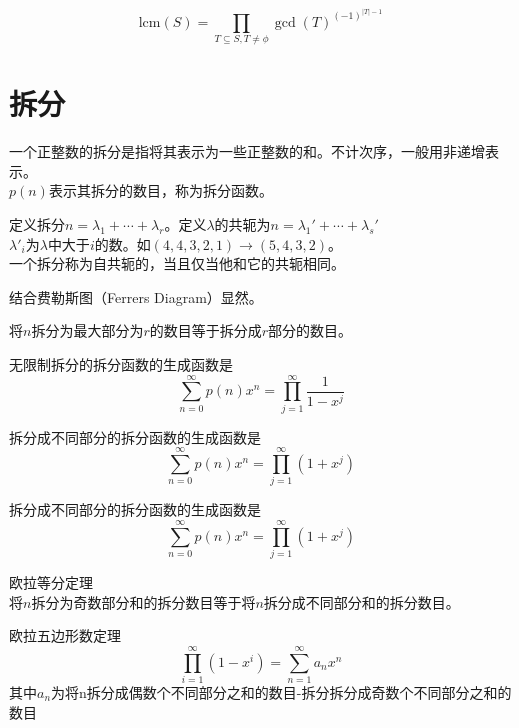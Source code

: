 \begin{proposition}
  $$
\text{lcm}(S)=\prod_{T\subseteq S ,T\neq \phi} \gcd(T)^{(-1)^{|T|-1}}
$$
\end{proposition}

\section{拆分}

\begin{definition}
  一个正整数的拆分是指将其表示为一些正整数的和。不计次序，一般用非递增表示。\\
  $p(n)$表示其拆分的数目，称为拆分函数。
\end{definition}

\begin{definition}
  定义拆分$n=\lambda_1 +\cdots + \lambda_r$。定义$\lambda$的共轭为$n=\lambda_1' +\cdots + \lambda_s'$\\
  $\lambda'_i$为$\lambda$中大于$i$的数。如$(4,4,3,2,1) \to (5,4,3,2)$。\\
  一个拆分称为自共轭的，当且仅当他和它的共轭相同。
\end{definition}
结合费勒斯图（Ferrers Diagram）显然。

\begin{theorem}
  将$n$拆分为最大部分为$r$的数目等于拆分成$r$部分的数目。
\end{theorem}

\begin{theorem}
  无限制拆分的拆分函数的生成函数是
  $$
  \sum_{n=0}^{\infty} p(n) x^n =\prod_{j=1} ^{\infty} \frac{1}{1-x^j}
  $$
\end{theorem}

\begin{theorem}
  拆分成不同部分的拆分函数的生成函数是
  $$
  \sum_{n=0}^{\infty} p(n) x^n =\prod_{j=1} ^{\infty} (1+x^j)
  $$
\end{theorem}

\begin{theorem}
  拆分成不同部分的拆分函数的生成函数是
  $$
  \sum_{n=0}^{\infty} p(n) x^n =\prod_{j=1} ^{\infty} (1+x^j)
  $$
\end{theorem}

\begin{theorem}
  欧拉等分定理\\
  将$n$拆分为奇数部分和的拆分数目等于将$n$拆分成不同部分和的拆分数目。
  
\end{theorem}

\begin{theorem}
  欧拉五边形数定理\\
  $$
  \prod_{i=1}^{\infty} (1-x^i) =\sum_{n=1}^{\infty} a_n x^n
  $$
  其中$a_n$为将n拆分成偶数个不同部分之和的数目-拆分拆分成奇数个不同部分之和的数目
\end{theorem}